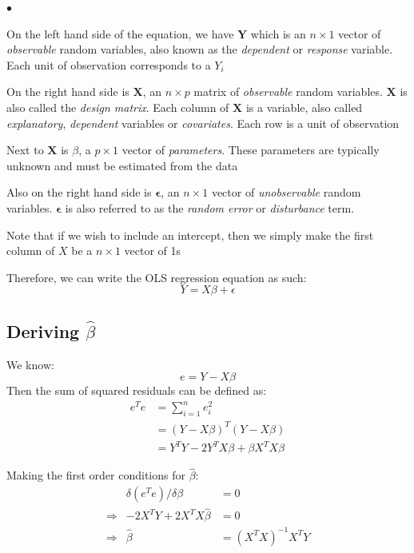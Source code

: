 \documentclass[12pt]{article}
\begin{document}
\begin{list}{$\bullet$}{}
\item On the left hand side of the equation, we have $\mathbf{Y}$ which is an $n \times 1$ vector of \emph{observable} random variables, also known as the \emph{dependent} or \emph{response} variable.  Each unit of observation corresponds to a $Y_{i}$
\item On the right hand side is $\mathbf{X}$, an $n \times p$ matrix of \emph{observable} random variables.  $\mathbf{X}$ is also called the \emph{design matrix}.  Each column of $\mathbf{X}$ is a variable, also called \emph{explanatory}, \emph{dependent} variables or \emph{covariates}.  Each row is a unit of observation
\item Next to $\mathbf{X}$ is $\beta$, a $p \times 1$ vector of \emph{parameters}.  These parameters are typically unknown and must be estimated from the data
\item Also on the right hand side is $\mathbf{\epsilon}$, an $n \times 1$ vector of \emph{unobservable} random variables.  $\mathbf{\epsilon}$ is also referred to as the \emph{random error} or \emph{disturbance} term.
\item Note that if we wish to include an intercept, then we simply make the first column of $X$ be a $n \times 1$ vector of 1s
\end{list}

Therefore, we can write the OLS regression equation as such:
\[ Y = X \beta + \epsilon \]

\subsection{Deriving $\hat{\beta}$}

We know:
\[ e = Y - X \beta  \]
Then the sum of squared residuals can be defined as:
\begin{align} e^{T}e &= \sum_{i = 1}^{n} e_{i}^2 \nonumber \\
 &= (Y - X \beta)^{T} (Y - X \beta) \nonumber\\
  &= Y^{T}Y - 2Y^{T}X\beta + \beta X^{T}X \beta \nonumber \end{align} 

Making the first order conditions for $\hat{\beta}$:
\doublespacing
\[ \begin{array}{rrl} & \delta (e^{T}e) / \delta \beta & = 0   \\
\Rightarrow & -2X^{T}Y + 2 X^{T}X\hat{\beta}  & = 0 \\
\Rightarrow & \hat{\beta} &= (X^{T}X)^{-1}X^{T}Y \end{array} \]
\singlespacing
\end{document}
